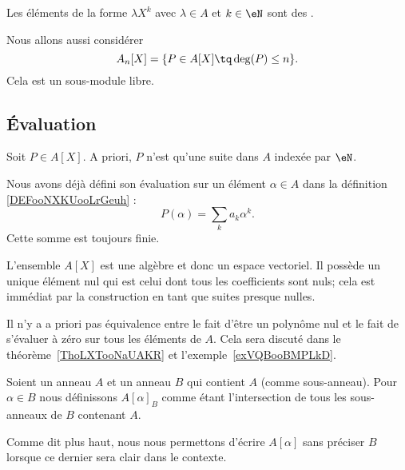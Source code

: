 \begin{normaltext}
Les éléments de la forme \( \lambda X^k\) avec \( \lambda\in A\) et \( k\in\eN\) sont des .

Nous allons aussi considérer
\begin{equation}
    A_n[X]=\{ P\in A[X]\tq \deg(P)\leq n \}.
\end{equation}
Cela est un sous-module libre.
\end{normaltext}

\subsection{Évaluation}

Soit \( P\in A[X]\). A priori, \( P\) n'est qu'une suite dans \( A\) indexée par \( \eN\). 


Nous avons déjà défini son évaluation sur un élément \( \alpha\in A\) dans la définition \ref{DEFooNXKUooLrGeuh} :
\begin{equation}
    P(\alpha)=\sum_ka_k\alpha^k.
\end{equation}
Cette somme est toujours finie.

\begin{normaltext}      \label{NORMooQFTJooLBcPxl}
    L'ensemble \( A[X]\) est une algèbre et donc un espace vectoriel. Il possède un unique élément nul qui est celui dont tous les coefficients sont nuls; cela est immédiat par la construction en tant que suites presque nulles.
\end{normaltext}

Il n'y a a priori pas équivalence entre le fait d'être un polynôme nul et le fait de s'évaluer à zéro sur tous les éléments de \( A\). Cela sera discuté dans le théorème~\ref{ThoLXTooNaUAKR} et l'exemple~\ref{exVQBooBMPLkD}.

\begin{definition}      \label{DEFooRFBFooKCXQsv}
    Soient un anneau \( A\) et un anneau \( B\) qui contient \( A\) (comme sous-anneau). Pour \( \alpha\in B\) nous définissons \( A[\alpha]_B\) comme étant l'intersection de tous les sous-anneaux de \( B\) contenant \( A\).
\end{definition}
Comme dit plus haut, nous nous permettons d'écrire \( A[\alpha]\) sans préciser \( B\) lorsque ce dernier sera clair dans le contexte.

